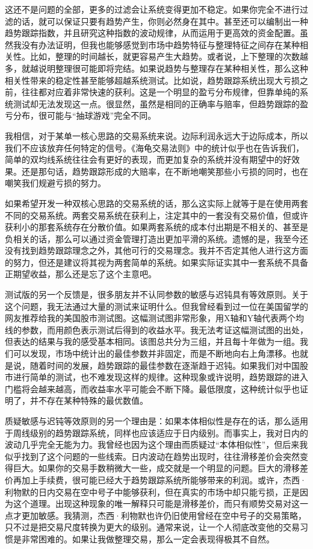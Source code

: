 这还不是问题的全部，更多的过滤会让系统变得更加不稳定。如果你完全不进行过滤的话，就可以保证只要有趋势产生，你则必然身在其中。甚至还可以编制出一种趋势跟踪指数，并且研究这种指数的波动规律，从而运用于更高效的资金配置。虽然我没有办法证明，但我也能够感觉到市场中趋势特征与整理特征之间存在某种相关性。比如，整理的时间越长，就更容易产生大趋势。或者说，上下整理的次数越多，就越说明整理很可能即将完结。如果说趋势与整理存在某种相关性，那么这种相关性带来的稳定性甚至能够超越系统测试。比如说，趋势跟踪系统出现大亏损之前，往往都对应着非常快速的获利。这是一个明显的盈亏分布规律，但靠单纯的系统测试却无法发现这一点。很显然，虽然是相同的正确率与赔率，但趋势跟踪的盈亏分布，很可能与“抽球游戏”完全不同。

我相信，对于某单一核心思路的交易系统来说。边际利润永远大于边际成本，所以我们不应该放弃任何特定的信号。《海龟交易法则》中的统计似乎也在告诉我们，简单的双均线系统往往会有更好的表现，而更加复杂的系统并没有期望中的好效果。还是那句话，趋势跟踪形成的大赔率，在不断地嘲笑那些小亏损的同时，也在嘲笑我们规避亏损的努力。

如果希望开发一种双核心思路的交易系统的话，那么这实际上就等于是在使用两套不同的交易系统。两套交易系统在获利上，注定其中的一套没有交易价值，但或许获利小的那套系统存在分散价值。如果两套系统的成本付出期是不相关的、甚至是负相关的话，那么可以通过资金管理打造出更加平滑的系统。遗憾的是，我至今还没有找到趋势跟踪理念之外，其他可行的交易理念。我并不否定其他人进行这方面的努力，但还是建议将其视为两套简单的系统。如果实际证实其中一套系统不具备正期望收益，那么还是忘了这个主意吧。

测试版的另一个反馈是，很多朋友并不认同参数的敏感与迟钝具有等效原则。关于这个问题，我无法通过大量的测试来证明什么。但我曾经看到过一位在美国留学的网友推荐给我的美国股市测试图。这幅测试图非常形象，用X轴和Y轴代表两个均线的参数，而用颜色表示测试后得到的收益水平。我无法考证这幅测试图的出处，但表达的结果与我的感受基本相同。该图总共分为三组，并且每十年做为一组。我们可以发现，市场中统计出的最佳参数并非固定，而是不断地向右上角漂移。也就是说，随着时间的发展，趋势跟踪的最佳参数在逐渐趋于迟钝。如果我们对中国股市进行简单的测试，也不难发现这样的规律。这种现象或许说明，趋势跟踪的进入门槛将会越来越高，而收益率水平可能会不断下降。最低限度，这种统计似乎也证明了，并不存在某种特殊的最优数值。

质疑敏感与迟钝等效原则的另一个理由是：如果本体相似性是存在的话，那么适用于周线级别的趋势跟踪系统，同样也应该适应于日内级别。而事实上，我对日内的波动几乎完全无能为力。我曾经也因为这个理由而质疑过“本体相似性”，但后来我似乎找到了这个问题的一些线索。日内波动在趋势出现时，往往滑移差价会突然变得巨大。如果你的交易手数稍微大一些，成交就是一个明显的问题。巨大的滑移差价再加上手续费，很可能已经大于趋势跟踪系统所能够带来的利润。或许，杰西·利物默的日内交易在空中号子中能够获利，但在真实的市场中却只能亏损，正是因为这个道理。出现这种现象的唯一解释只可能是滑移差价，而只有顺势交易对这一点才更加敏感。我猜测，杰西·利物默也许仍旧使用曾经在空中号子的交易策略，只不过是把交易尺度转换为更大的级别。通常来说，让一个人彻底改变他的交易习惯是非常困难的。如果让我做整理交易，那么一定会表现得极其不自然。

